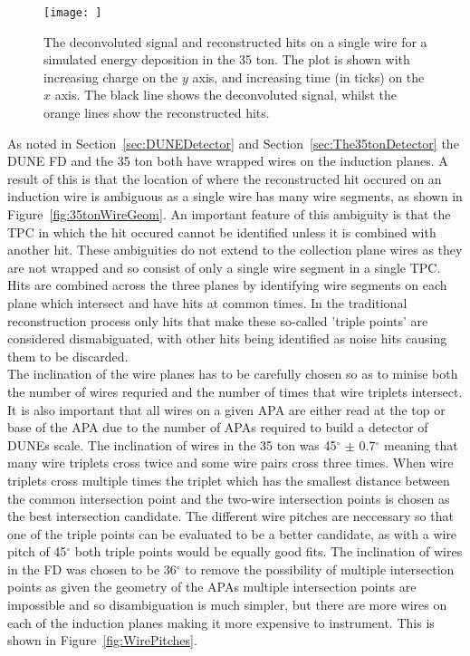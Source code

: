 \begin{figure}[h]
  \centering
  \texttt{[image: ]}
  \caption[Reconstructed hits from a simulated energy deposition]{The deconvoluted signal and reconstructed hits on a single wire for a simulated energy deposition in the 35 ton. The plot is shown with increasing charge on the $y$ axis, and increasing time (in ticks) on the $x$ axis. The black line shows the deconvoluted signal, whilst the orange lines show the reconstructed hits.}
  \label{fig:LotsOfHits}
\end{figure}

As noted in Section~\ref{sec:DUNEDetector} and Section~\ref{sec:The35tonDetector} the DUNE FD and the 35 ton both have wrapped wires on the induction planes. A result of this is that the location of where the reconstructed hit occured on an induction wire is ambiguous as a single wire has many wire segments, as shown in Figure~\ref{fig:35tonWireGeom}. An important feature of this ambiguity is that the TPC in which the hit occured cannot be identified unless it is combined with another hit. These ambiguities do not extend to the collection plane wires as they are not wrapped and so consist of only a single wire segment in a single TPC. Hits are combined across the three planes by identifying wire segments on each plane which intersect and have hits at common times. In the traditional reconstruction process only hits that make these so-called 'triple points' are considered dismabiguated, with other hits being identified as noise hits causing them to be discarded. \\

The inclination of the wire planes has to be carefully chosen so as to minise both the number of wires requried and the number of times that wire triplets intersect. It is also important that all wires on a given APA are either read at the top or base of the APA due to the number of APAs required to build a detector of DUNEs scale. The inclination of wires in the 35 ton was 45$^{\circ}$ $\pm$ 0.7$^{\circ}$ meaning that many wire triplets cross twice and some wire pairs cross three times. When wire triplets cross multiple times the triplet which has the smallest distance between the common intersection point and the two-wire intersection points is chosen as the best intersection candidate. The different wire pitches are neccessary so that one of the triple points can be evaluated to be a better candidate, as with a wire pitch of 45$^{\circ}$ both triple points would be equally good fits. The inclination of wires in the FD was chosen to be 36$^{\circ}$ to remove the possibility of multiple intersection points as given the geometry of the APAs multiple intersection points are impossible and so disambiguation is much simpler, but there are more wires on each of the induction planes making it more expensive to instrument. This is shown in Figure~\ref{fig:WirePitches}.

